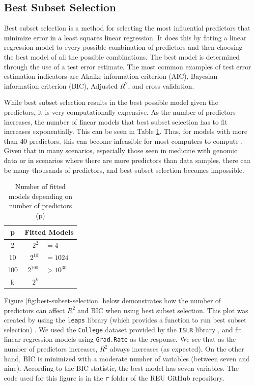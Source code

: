 \documentclass{article}
\begin{document}
\subsection{Best Subset Selection}
Best subset selection is a method for selecting the most influential predictors that minimize error in a least squares linear regression. It does this by fitting a linear regression model to every possible combination of predictors and then choosing the best model of all the possible combinations. The best model is determined through the use of a test error estimate. The most common examples of test error estimation indicators are Akaike information criterion (AIC), Bayesian information criterion (BIC), Adjusted $R^2$, and cross validation.

While best subset selection results in the best possible model given the predictors, it is very computationally expensive. As the number of predictors increases, the number of linear models that best subset selection has to fit increases exponentially. This can be seen in Table \ref{tab:subset-combinations}. Thus, for models with more than 40 predictors, this can become infeasible for most computers to compute \cite{james2013introduction}. Given that in many scenarios, especially those seen in medicine with genomic data or in scenarios where there are more predictors than data samples, there can be many thousands of predictors, and best subset selection becomes impossible.

\begin{table}[h!]
	\centering
	\caption{Number of fitted models depending on number of predictors (p)}
	\vspace{0.1in}
	\begin{tabular}{c|r@{\hskip 4pt}l}
		\hline
		p  &  \multicolumn{2}{c}{Fitted Models}\\
		\hline
		2   & $2^2$ & $=4$ \\
		10  & $2^{10}$ & $=1024$ \\
		100 & $2^{100}$ & $>10^{30}$ \\
		k   & $2^k$ & \\
	\end{tabular}
\label{tab:subset-combinations}
\end{table}

Figure \ref{fig:best-subset-selection} below demonstrates how the number of predictors can affect $R^2$ and BIC when using best subset selection. This plot was created by using the \lstinline!leaps! library (which provides a function to run best subset selection) \cite{lumley2020leaps}. We used the \lstinline!College! dataset provided by the \lstinline!ISLR! library \cite{james2017islr}, and fit linear regression models using \lstinline!Grad.Rate! as the response. We see that as the number of predictors increases, $R^2$ always increases (as expected). On the other hand, BIC is minimized with a moderate number of variables (between seven and nine). According to the BIC statistic, the best model has seven variables. The code used for this figure is in the \lstinline!r! folder of the REU GitHub repository.
\end{document}
